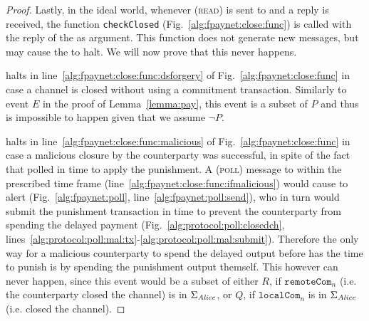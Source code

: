 \begin{proof}
  Lastly, in the ideal world, whenever (\textsc{read}) is sent to \ledger{} and
  a reply is received, the function \texttt{checkClosed}
  (Fig.~\ref{alg:fpaynet:close:func}) is called with the reply of the \ledger{}
  as argument. This function does not generate new messages, but may cause the
  \fpaynet{} to halt. We will now prove that this never happens.

  \fpaynet{} halts in line~\ref{alg:fpaynet:close:func:dsforgery} of
  Fig.~\ref{alg:fpaynet:close:func} in case a channel is closed without using a
  commitment transaction. Similarly to event $E$ in the proof of
  Lemma~\ref{lemma:pay}, this event is a subset of $P$ and thus is impossible to
  happen given that we assume $\neg P$.

  \fpaynet{} halts in line~\ref{alg:fpaynet:close:func:malicious} of
  Fig.~\ref{alg:fpaynet:close:func} in case a malicious closure by the
  counterparty was successful, in spite of the fact that \alice{} polled in time
  to apply the punishment. A (\textsc{poll}) message to \alice{} within the
  prescribed time frame (line~\ref{alg:fpaynet:close:func:ifmalicious}) would
  cause \fpaynet{} to alert \simulator{} (Fig.~\ref{alg:fpaynet:poll},
  line~\ref{alg:fpaynet:poll:send}), who in turn would submit the punishment
  transaction in time to prevent the counterparty from spending the delayed
  payment (Fig.~\ref{alg:protocol:poll:closedch},
  lines~\ref{alg:protocol:poll:mal:tx}-\ref{alg:protocol:poll:mal:submit}).
  Therefore the only way for a malicious counterparty to spend the delayed
  output before \alice{} has the time to punish is by spending the punishment
  output themself. This however can never happen, since this event would be a
  subset of either $R$, if $\mathtt{remoteCom}_n$ (i.e. the counterparty closed
  the channel) is in $\Sigma_{\mathit{Alice}}$, or $Q$, if $\mathtt{localCom}_n$ is in
  $\Sigma_{\mathit{Alice}}$ (i.e. \alice{} closed the channel).


\end{proof}
